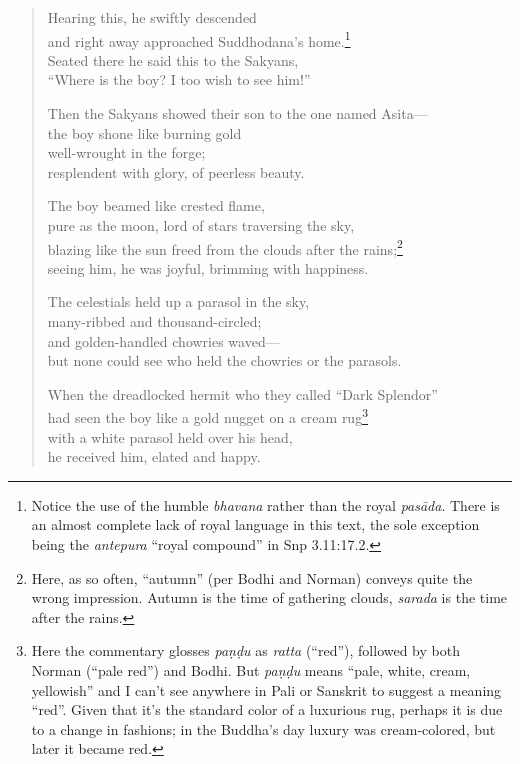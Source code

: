 \documentclass[12pt,openany]{book}%
\begin{document}
\begin{verse}
Hearing this, he swiftly descended \\
and right away approached Suddhodana’s home.\footnote{Notice the use of the humble \textit{bhavana} rather than the royal \textit{\textsanskrit{pasāda}}. There is an almost complete lack of royal language in this text, the sole exception being the \textit{antepura} “royal compound” in Snp 3.11:17.2. } \\
Seated there he said this to the Sakyans, \\
“Where is the boy? I too wish to see him!” 

Then the Sakyans showed their son to the one named Asita—\\
the boy shone like burning gold \\
well-wrought in the forge; \\
resplendent with glory, of peerless beauty. 

The boy beamed like crested flame, \\
pure as the moon, lord of stars traversing the sky, \\
blazing like the sun freed from the clouds after the rains;\footnote{Here, as so often, “autumn” (per Bodhi and Norman) conveys quite the wrong impression. Autumn is the time of gathering clouds, \textit{sarada} is the time after the rains. } \\
seeing him, he was joyful, brimming with happiness. 

The celestials held up a parasol in the sky, \\
many-ribbed and thousand-circled; \\
and golden-handled chowries waved—\\
but none could see who held the chowries or the parasols. 

When the dreadlocked hermit who they called “Dark Splendor” \\
had seen the boy like a gold nugget on a cream rug\footnote{Here the commentary glosses \textit{\textsanskrit{paṇḍu}} as \textit{ratta} (“red”), followed by both Norman (“pale red”) and Bodhi. But \textit{\textsanskrit{paṇḍu}} means “pale, white, cream, yellowish” and I can’t see anywhere in Pali or Sanskrit to suggest a meaning “red”. Given that it’s the standard color of a luxurious rug, perhaps it is due to a change in fashions; in the Buddha’s day luxury was cream-colored, but later it became red. } \\
with a white parasol held over his head, \\
he received him, elated and happy. 


\end{verse}
\end{document}
